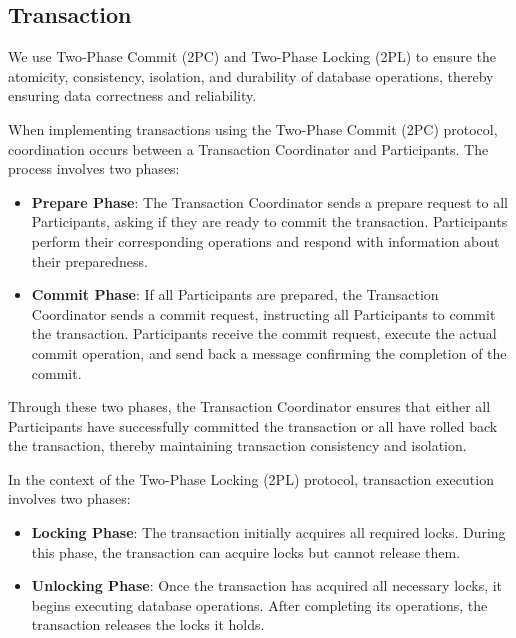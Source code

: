\documentclass[sigconf]{acmart}
\begin{document}
\subsection{Transaction}
We use Two-Phase Commit (2PC)\cite{lampson1979crash} \cite{fan20202pc} and Two-Phase Locking (2PL) \cite{lin1983basic}\cite{barthels2019strong} to ensure the atomicity, consistency, isolation, and durability of database operations, thereby ensuring data correctness and reliability.

When implementing transactions using the Two-Phase Commit (2PC) protocol, coordination occurs between a Transaction Coordinator and Participants. The process involves two phases:

\begin{itemize}
    \item \textbf{Prepare Phase}: The Transaction Coordinator sends a prepare request to all Participants, asking if they are ready to commit the transaction. Participants perform their corresponding operations and respond with information about their preparedness.
    
    \item \textbf{Commit Phase}: If all Participants are prepared, the Transaction Coordinator sends a commit request, instructing all Participants to commit the transaction. Participants receive the commit request, execute the actual commit operation, and send back a message confirming the completion of the commit.
\end{itemize}

Through these two phases, the Transaction Coordinator ensures that either all Participants have successfully committed the transaction or all have rolled back the transaction, thereby maintaining transaction consistency and isolation.

In the context of the Two-Phase Locking (2PL) protocol, transaction execution involves two phases:

\begin{itemize}
    \item \textbf{Locking Phase}: The transaction initially acquires all required locks. During this phase, the transaction can acquire locks but cannot release them.
    
    \item \textbf{Unlocking Phase}: Once the transaction has acquired all necessary locks, it begins executing database operations. After completing its operations, the transaction releases the locks it holds.
\end{itemize}
\end{document}
